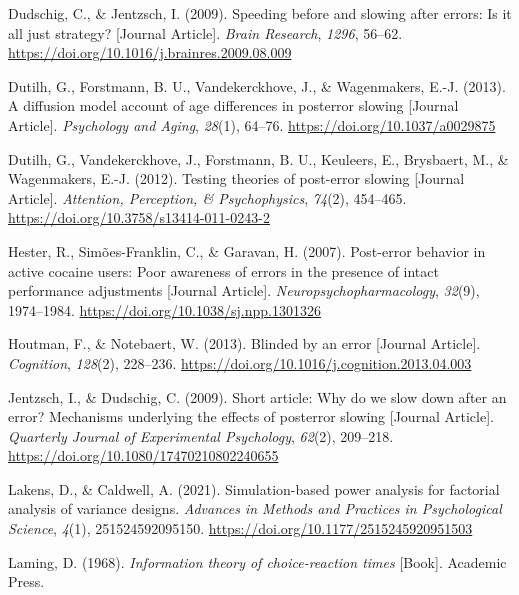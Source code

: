 \documentclass[
  man,floatsintext]{apa7}
\newlength{\cslhangindent}
\newlength{\cslentryspacingunit} %
\newenvironment{CSLReferences}[2] %
 {%
  \setlength{\parindent}{0pt}
  \ifodd #1
  \let\oldpar\par
  \def\par{\hangindent=\cslhangindent\oldpar}
  \fi
  \setlength{\parskip}{#2\cslentryspacingunit}
 }%
 {}
\begin{document}
\begin{CSLReferences}{1}{0}
\leavevmode{}%
Dudschig, C., \& Jentzsch, I. (2009). Speeding before and slowing after errors: Is it all just strategy? {[}Journal Article{]}. \emph{Brain Research}, \emph{1296}, 56--62. \url{https://doi.org/10.1016/j.brainres.2009.08.009}

\leavevmode{}%
Dutilh, G., Forstmann, B. U., Vandekerckhove, J., \& Wagenmakers, E.-J. (2013). A diffusion model account of age differences in posterror slowing {[}Journal Article{]}. \emph{Psychology and Aging}, \emph{28}(1), 64--76. \url{https://doi.org/10.1037/a0029875}

\leavevmode{}%
Dutilh, G., Vandekerckhove, J., Forstmann, B. U., Keuleers, E., Brysbaert, M., \& Wagenmakers, E.-J. (2012). Testing theories of post-error slowing {[}Journal Article{]}. \emph{Attention, Perception, \& Psychophysics}, \emph{74}(2), 454--465. \url{https://doi.org/10.3758/s13414-011-0243-2}

\leavevmode{}%
Hester, R., Simões-Franklin, C., \& Garavan, H. (2007). Post-error behavior in active cocaine users: Poor awareness of errors in the presence of intact performance adjustments {[}Journal Article{]}. \emph{Neuropsychopharmacology}, \emph{32}(9), 1974--1984. \url{https://doi.org/10.1038/sj.npp.1301326}

\leavevmode{}%
Houtman, F., \& Notebaert, W. (2013). Blinded by an error {[}Journal Article{]}. \emph{Cognition}, \emph{128}(2), 228--236. \url{https://doi.org/10.1016/j.cognition.2013.04.003}

\leavevmode{}%
Jentzsch, I., \& Dudschig, C. (2009). Short article: Why do we slow down after an error? Mechanisms underlying the effects of posterror slowing {[}Journal Article{]}. \emph{Quarterly Journal of Experimental Psychology}, \emph{62}(2), 209--218. \url{https://doi.org/10.1080/17470210802240655}

\leavevmode{}%
Lakens, D., \& Caldwell, A. (2021). Simulation-based power analysis for factorial analysis of variance designs. \emph{Advances in Methods and Practices in Psychological Science}, \emph{4}(1), 251524592095150. \url{https://doi.org/10.1177/2515245920951503}

\leavevmode{}%
Laming, D. (1968). \emph{Information theory of choice-reaction times} {[}Book{]}. Academic Press.


\end{CSLReferences}
\end{document}
